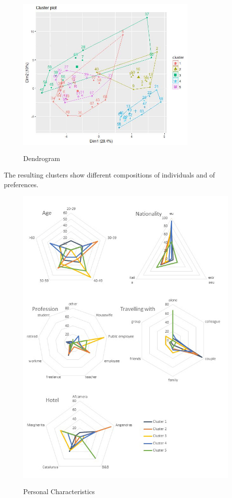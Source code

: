 \documentclass[a4paper]{article}
\begin{document}
\begin{figure}[h]
  \centering
    \includegraphics[width=9cm]{grW5}\\
  \caption{Dendrogram}\label{grW5}
\end{figure}

The resulting clusters show different compositions of individuals and of preferences.
\begin{figure}[h]
  \centering
    \includegraphics[width=\textwidth]{grafici1}\\
  \caption{Personal Characteristics}\label{gr1}
\end{figure}
\end{document}
